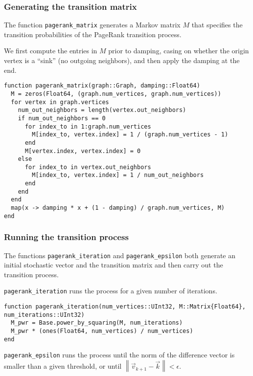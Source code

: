 \documentclass[12pt, titlepage, twoside]{amsart}
\begin{document}
\subsubsection{Generating the transition matrix}

The function \texttt{pagerank_matrix} generates a Markov matrix $M$ that specifies the transition
probabilities of the PageRank transition process.

We first compute the entries in $M$ prior to damping, casing on whether the origin vertex is a ``sink''
(no outgoing neighbors), and then apply the damping at the end.

\begin{verbatim}
function pagerank_matrix(graph::Graph, damping::Float64)
  M = zeros(Float64, (graph.num_vertices, graph.num_vertices))
  for vertex in graph.vertices
    num_out_neighbors = length(vertex.out_neighbors)
    if num_out_neighbors == 0
      for index_to in 1:graph.num_vertices
        M[index_to, vertex.index] = 1 / (graph.num_vertices - 1)
      end
      M[vertex.index, vertex.index] = 0
    else
      for index_to in vertex.out_neighbors
        M[index_to, vertex.index] = 1 / num_out_neighbors
      end
    end
  end
  map(x -> damping * x + (1 - damping) / graph.num_vertices, M)
end
\end{verbatim}

\subsubsection{Running the transition process}

The functions \texttt{pagerank_iteration} and \texttt{pagerank_epsilon} both generate
an initial stochastic vector and the transition matrix and then carry out the transition process.

\texttt{pagerank_iteration} runs the process for a given number of iterations.

\begin{verbatim}
function pagerank_iteration(num_vertices::UInt32, M::Matrix{Float64}, num_iterations::UInt32)
  M_pwr = Base.power_by_squaring(M, num_iterations) 
  M_pwr * (ones(Float64, num_vertices) / num_vertices)
end
\end{verbatim}

\texttt{pagerank_epsilon} runs the process until the norm of the difference vector
is smaller than a given threshold, or until
$\left\lVert\vec{v}_{k + 1} - \vec{k}\right\rVert < \epsilon$.
\end{document}
